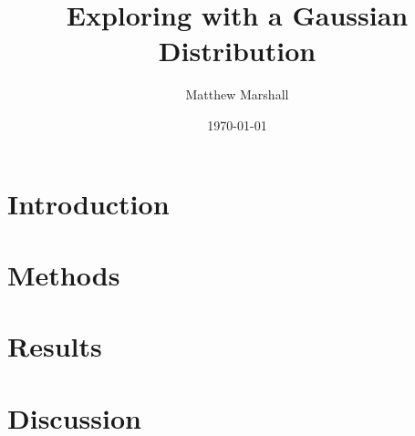 \documentclass[11pt]{article}
\title{Exploring with a Gaussian Distribution}
\author{Matthew Marshall}
\date{\today}
\begin{document}
\maketitle

\section{Introduction}
\label{sec:intro}


\section{Methods}
\label{sec:meth}


\section{Results}
\label{sec:res}


\section{Discussion}
\label{sec:disc}




\end{document}
